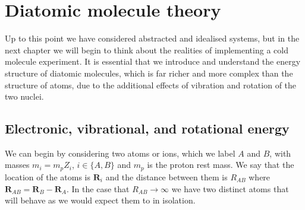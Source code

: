 \section{Diatomic molecule theory}
\label{theory:molecules}

Up to this point we have considered abstracted and idealised systems, but in
the next chapter we will begin to think about the realities of implementing a
cold molecule experiment. It is essential that we introduce and understand the
energy structure of diatomic molecules, which is far richer and more complex
than the structure of atoms, due to the additional effects of vibration and
rotation of the two nuclei.

\subsection{Electronic, vibrational, and rotational energy}

We can begin by considering two atoms or ions, which we label $A$ and $B$,
with masses  $m_i = m_p Z_i$, $i\in\{A,B\}$ and $m_p$ is the proton rest mass. We say that the location of the
atoms is $\mathbf{R}_i$ and the distance between them is
$R_{AB}$ where $\mathbf{R}_{AB} = \mathbf{R}_B - \mathbf{R}_A$. In the case
that $R_{AB} \rightarrow \infty$ we have two distinct atoms that will behave 
as we would expect them to in isolation. 

